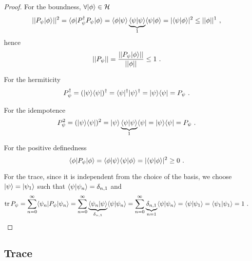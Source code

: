     \begin{proof}
        For the boundness, $\forall \vert\phi\rangle \in \mathcal H$
        \begin{equation*}
            ||P_\psi \vert\phi\rangle||^2 = \langle\phi\vert P_\psi^\dagger P_\psi \vert\phi\rangle = \langle\phi\vert\psi\rangle \underbrace{\langle\psi\vert\psi\rangle}_1 \langle\psi\vert\phi\rangle = |\langle\psi\vert\phi\rangle|^2 \leq ||\phi||^1 ~,
        \end{equation*}
        hence 
        \begin{equation*}
            ||P_\psi|| = \frac{||P_\psi \vert\phi\rangle||}{||\phi||} \leq 1 ~.
        \end{equation*}

        For the hermiticity
        \begin{equation*}
            P_\psi^\dagger = (\vert\psi\rangle \langle\psi\vert)^\dagger = \langle\psi\vert^\dagger \vert\psi\rangle^\dagger = \vert\psi\rangle \langle\psi\vert = P_\psi ~.
        \end{equation*}

        For the idempotence
        \begin{equation*}
            P_\psi^2 = (\vert\psi\rangle \langle\psi\vert)^2 = \vert\psi\rangle \underbrace{\langle\psi\vert\psi\rangle}_1 \langle\psi\vert = \vert\psi\rangle \langle\psi\vert = P_\psi ~.
        \end{equation*}

        For the positive definedness 
        \begin{equation*}
            \langle\phi\vert P_\psi \vert\phi\rangle = \langle\phi\vert\psi\rangle \langle\psi\vert\phi\rangle = |\langle\psi\vert\phi\rangle|^2 \geq 0 ~.
        \end{equation*}

        For the trace, since it is independent from the choice of the basis, we choose $\vert\psi\rangle = \vert\psi_1\rangle$ such that $\langle\psi\vert\psi_n\rangle = \delta_{n,1}$ and 
        \begin{equation*}
            \operatorname{tr} P_\psi = \sum_{n=0}^{\infty} \langle\psi_n\vert P_\psi \vert\psi_n\rangle = \sum_{n=0}^{\infty} \underbrace{\langle\psi_n\vert\psi\rangle}_{\delta_{n,1}} \langle\psi\vert\psi_n\rangle = \sum_{n=0}^{\infty} \underbrace{\delta_{n,1}}_{n=1} \langle\psi\vert\psi_n\rangle = \langle\psi\vert\psi_1\rangle = \langle\psi_1\vert\psi_1\rangle = 1 ~.
        \end{equation*}
    \end{proof}

\subsection{Trace}

